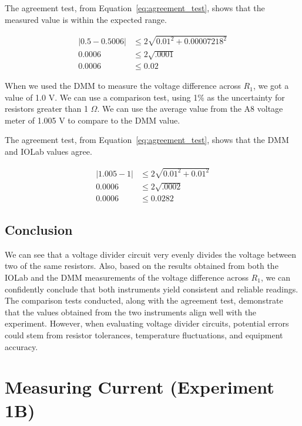 \documentclass[11pt]{article}
\let\oldsection\section
\renewcommand\section{\clearpage\oldsection}
\begin{document}
    The agreement test, from Equation~\ref{eq:agreement_test}, shows that the measured value is within the expected range.
    \begin{e}
        \begin{align*}
            |0.5 - 0.5006| &\le 2 \sqrt{0.01^2 + 0.00007218^2} \\
            0.0006 &\le 2 \sqrt{.0001} \\
            0.0006 &\le 0.02
        \end{align*}
    \end{e}

    When we used the DMM to measure the voltage difference across $R_1$, we got a value of 1.0 V. We can use a
    comparison test, using 1\% as the uncertainty for resistors greater than 1 $\Omega$.
    We can use the average value from the A8 voltage meter of 1.005 V to compare to the DMM value.
    
    The agreement test, from Equation~\ref{eq:agreement_test}, shows that the DMM and IOLab values agree.
    \begin{e}
        \begin{align*}
            |1.005 - 1| &\le 2 \sqrt{0.01^2 + 0.01^2} \\
            0.0006 &\le 2 \sqrt{.0002} \\
            0.0006 &\le 0.0282
        \end{align*}
    \end{e}

    \subsection{Conclusion}\label{subsec:voltage_conclusion}

    We can see that a voltage divider circuit very evenly divides the voltage between two of the same resistors.
    Also, based on the results obtained from both the IOLab and the DMM measurements of the voltage difference across $R_1$, we can confidently conclude that both instruments yield consistent and reliable readings.
    The comparison tests conducted, along with the agreement test, demonstrate that the values obtained from the two instruments align well with the experiment.
    However, when evaluating voltage divider circuits, potential errors could stem from resistor tolerances, temperature fluctuations, and equipment accuracy.

    \section{Measuring Current (Experiment 1B)}\label{sec:current}
\end{document}
